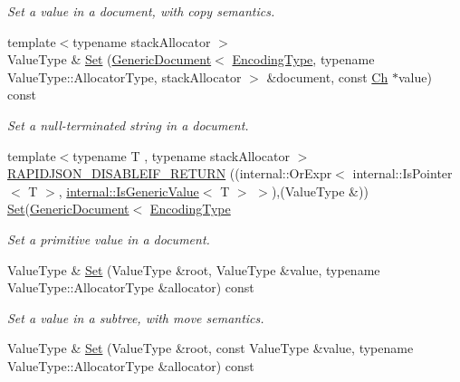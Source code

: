 \begin{DoxyCompactItemize}
\begin{DoxyCompactList}\small\item\em Set a value in a document, with copy semantics. \end{DoxyCompactList}\item 
{\footnotesize template$<$typename stack\+Allocator $>$ }\\Value\+Type \& \hyperlink{class_generic_pointer_a09a5893890650b15939322a5d962c70a}{Set} (\hyperlink{class_generic_document}{Generic\+Document}$<$ \hyperlink{class_generic_pointer_a4b802da797a7a0b615fd9611cedb7c3b}{Encoding\+Type}, typename Value\+Type\+::\+Allocator\+Type, stack\+Allocator $>$ \&document, const \hyperlink{class_generic_pointer_ab292356c11b4015c98d21b966b11f285}{Ch} $\ast$value) const \hypertarget{class_generic_pointer_a09a5893890650b15939322a5d962c70a}{}\label{class_generic_pointer_a09a5893890650b15939322a5d962c70a}

\begin{DoxyCompactList}\small\item\em Set a null-\/terminated string in a document. \end{DoxyCompactList}\item 
{\footnotesize template$<$typename T , typename stack\+Allocator $>$ }\\\hyperlink{class_generic_pointer_a1bb4a253f33687734e5b20795632a801}{R\+A\+P\+I\+D\+J\+S\+O\+N\+\_\+\+D\+I\+S\+A\+B\+L\+E\+I\+F\+\_\+\+R\+E\+T\+U\+RN} ((internal\+::\+Or\+Expr$<$ internal\+::\+Is\+Pointer$<$ T $>$, \hyperlink{structinternal_1_1_is_generic_value}{internal\+::\+Is\+Generic\+Value}$<$ T $>$ $>$),(Value\+Type \&)) \hyperlink{class_generic_pointer_adf0aa776e072b41d301e2a834ac2c2b5}{Set}(\hyperlink{class_generic_document}{Generic\+Document}$<$ \hyperlink{class_generic_pointer_a4b802da797a7a0b615fd9611cedb7c3b}{Encoding\+Type}
\begin{DoxyCompactList}\small\item\em Set a primitive value in a document. \end{DoxyCompactList}\item 
Value\+Type \& \hyperlink{class_generic_pointer_adf0aa776e072b41d301e2a834ac2c2b5}{Set} (Value\+Type \&root, Value\+Type \&value, typename Value\+Type\+::\+Allocator\+Type \&allocator) const 
\begin{DoxyCompactList}\small\item\em Set a value in a subtree, with move semantics. \end{DoxyCompactList}\item 
Value\+Type \& \hyperlink{class_generic_pointer_a80ceefa779d8d8e4699c433eb40ef1fa}{Set} (Value\+Type \&root, const Value\+Type \&value, typename Value\+Type\+::\+Allocator\+Type \&allocator) const \hypertarget{class_generic_pointer_a80ceefa779d8d8e4699c433eb40ef1fa}{}\label{class_generic_pointer_a80ceefa779d8d8e4699c433eb40ef1fa}


\end{DoxyCompactItemize}
